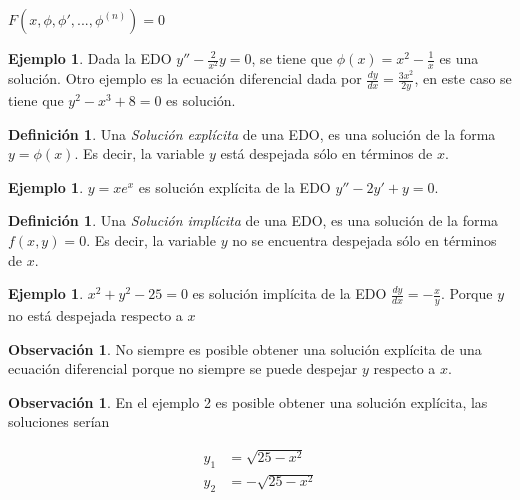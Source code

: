 \documentclass{article}
\theoremstyle{plain}
\theoremstyle{definition}
\newtheorem{defin}[thm]{Definición}
\newtheorem{ejem}[thm]{Ejemplo}
\newtheorem{rmk}[thm]{Observación}
\begin{document}
\begin{center}
$F(x,\phi,\phi',... ,\phi^{(n)} )=0$
\end{center}

\begin{ejem}Dada la EDO $\displaystyle y''-\frac{2}{x^2}y =0$, se tiene que $\phi(x)= \displaystyle x^2-\frac{1}{x}$ es una solución. Otro ejemplo es la ecuación diferencial dada por $\displaystyle \frac{dy}{dx} =\frac{3x^2}{2y}$, en este caso se tiene que $y^2-x^3+8=0$ es solución. \\
\end{ejem}






\begin{defin}Una \textit{Solución explícita} de una EDO, es una solución de la forma $y = \phi(x)$. Es decir, la variable $y$ está despejada sólo en términos de $x$. \\
\end{defin}


\begin{ejem}$y= xe^x$ es solución explícita de la EDO $y''-2y'+y=0$. \\
\end{ejem}




\begin{defin}Una \textit{Solución implícita} de una EDO, es una solución de la forma $f(x,y) = 0$. Es decir, la variable  $y$ no se encuentra despejada sólo  en términos de $x$. \\
\end{defin}


\begin{ejem}$x^2+y^2-25=0$ es solución implícita de la EDO $\displaystyle \frac{dy}{dx}= -\frac{x}{y}$. Porque $y$ no está despejada respecto a $x$\\
\end{ejem}


\begin{rmk}No siempre es posible obtener una solución explícita de una ecuación diferencial porque no siempre se puede despejar $y$ respecto a $x$. \\
\end{rmk}


\begin{rmk}En el ejemplo 2 es posible obtener una solución explícita, las soluciones serían
\end{rmk}

\begin{align*}
    y_1 &= \sqrt{25-x^2} \\
    y_2 &= -\sqrt{25-x^2}
\end{align*}
\end{document}
